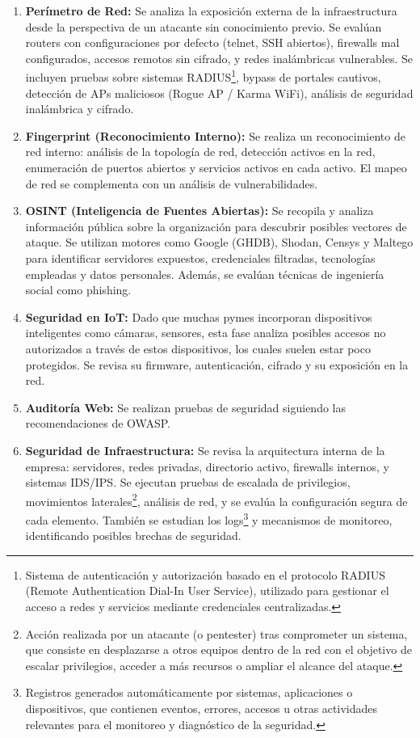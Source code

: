 \documentclass[a4paper, 11pt]{article}
\begin{document}
\begin{enumerate}
    \item \textbf{Perímetro de Red:} Se analiza la exposición externa de la infraestructura desde la perspectiva de un atacante sin conocimiento previo. Se evalúan routers con configuraciones por defecto (telnet, SSH abiertos), firewalls mal configurados, accesos remotos sin cifrado, y redes inalámbricas vulnerables. Se incluyen pruebas sobre sistemas RADIUS\footnote{Sistema de autenticación y autorización basado en el protocolo RADIUS (Remote Authentication Dial-In User Service), utilizado para gestionar el acceso a redes y servicios mediante credenciales centralizadas.}, bypass de portales cautivos, detección de APs maliciosos (Rogue AP / Karma WiFi), análisis de seguridad inalámbrica y cifrado.

\item \textbf{Fingerprint (Reconocimiento Interno):} Se realiza un reconocimiento de red interno: análisis de la topología de red, detección activos en la red, enumeración de puertos abiertos y servicios activos en cada activo. 
El mapeo de red se complementa con un análisis de vulnerabilidades.

\item \textbf{OSINT (Inteligencia de Fuentes Abiertas):} Se recopila y analiza información pública sobre la organización para descubrir posibles vectores de ataque. Se utilizan motores como Google (GHDB), Shodan, Censys y Maltego para identificar servidores expuestos, credenciales filtradas, tecnologías empleadas y datos personales. Además, se evalúan técnicas de ingeniería social como phishing.

\item \textbf{Seguridad en IoT:} Dado que muchas pymes incorporan dispositivos inteligentes como cámaras, sensores, esta fase analiza posibles accesos no autorizados a través de estos dispositivos, los cuales suelen estar poco protegidos. Se revisa su firmware, autenticación, cifrado y su exposición en la red.
\item \textbf{Auditoría Web:} Se realizan pruebas de seguridad siguiendo las recomendaciones de OWASP. 

\item \textbf{Seguridad de Infraestructura:} Se revisa la arquitectura interna de la empresa: servidores, redes privadas, directorio activo, 
firewalls internos, y sistemas IDS/IPS. Se ejecutan pruebas de escalada de privilegios,  movimientos laterales\footnote{Acción realizada por un atacante (o pentester) tras comprometer un sistema, que consiste en desplazarse a otros equipos dentro de la red con el objetivo de escalar privilegios, acceder a más recursos o ampliar el alcance del ataque.}, análisis de red, 
y se evalúa la configuración segura de cada elemento. También se estudian los logs\footnote{Registros generados automáticamente por sistemas, aplicaciones o dispositivos, que contienen eventos, errores, accesos u otras actividades relevantes para el monitoreo y diagnóstico de la seguridad.} y mecanismos de monitoreo, identificando posibles brechas de seguridad.


\end{enumerate}
\end{document}
